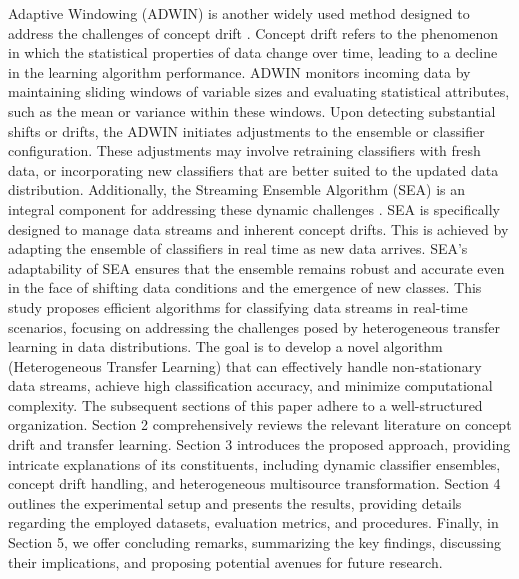 Adaptive Windowing (ADWIN) is another widely used method designed to address the challenges of concept drift \cite{madkour2023historical}. Concept drift refers to the phenomenon in which the statistical properties of data change over time, leading to a decline in the learning algorithm performance. ADWIN monitors incoming data by maintaining sliding windows of variable sizes and evaluating statistical attributes, such as the mean or variance within these windows. Upon detecting substantial shifts or drifts, the ADWIN initiates adjustments to the ensemble or classifier configuration. These adjustments may involve retraining classifiers with fresh data, or incorporating new classifiers that are better suited to the updated data distribution. Additionally, the Streaming Ensemble Algorithm (SEA) is an integral component for addressing these dynamic challenges \cite{gama2004learning}\cite{adams2023explainable}\cite{madkour2023historical}. SEA is specifically designed to manage data streams and inherent concept drifts. This is achieved by adapting the ensemble of classifiers in real time as new data arrives. SEA's adaptability of SEA ensures that the ensemble remains robust and accurate even in the face of shifting data conditions and the emergence of new classes.
This study proposes efficient algorithms for classifying data streams in real-time scenarios, focusing on addressing the challenges posed by heterogeneous transfer learning in data distributions. The goal is to develop a novel algorithm (Heterogeneous Transfer Learning) that can effectively handle non-stationary data streams, achieve high classification accuracy, and minimize computational complexity. 
The subsequent sections of this paper adhere to a well-structured organization. Section 2 comprehensively reviews the relevant literature on concept drift and transfer learning. Section 3 introduces the proposed approach, providing intricate explanations of its constituents, including dynamic classifier ensembles, concept drift handling, and heterogeneous multisource transformation. Section 4 outlines the experimental setup and presents the results, providing details regarding the employed datasets, evaluation metrics, and procedures. Finally, in Section 5, we offer concluding remarks, summarizing the key findings, discussing their implications, and proposing potential avenues for future research.
